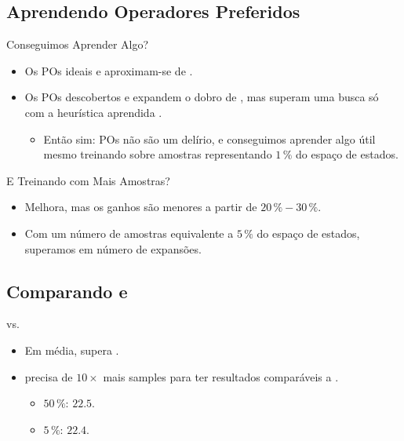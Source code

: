 \documentclass{beamer}
\begin{document}
\subsection{Aprendendo Operadores Preferidos}
\begin{frame}{Conseguimos Aprender Algo?}

\begin{itemize}
\item Os POs ideais \postartable e \postar aproximam-se de \hstar.
\pause
\item Os POs descobertos \pogstar e \pog expandem o dobro de \hstar, mas superam uma busca só com a heurística aprendida \hnn.
\pause
  \begin{itemize}
    \item Então sim: POs não são um delírio, e \alert{conseguimos aprender algo útil} mesmo treinando sobre amostras representando \alert{$1\,\%$ do espaço de estados}.
  \end{itemize}
\end{itemize}
\end{frame}

\begin{frame}{E Treinando com Mais Amostras?}

\begin{itemize}
  \item Melhora, mas os ganhos são menores a partir de $20\,\% - 30\,\%$.
  \pause
  \item Com um número de amostras equivalente a \alert{$5\,\%$} do espaço de estados, \alert{superamos \poff} em número de expansões.
\end{itemize}
\end{frame}

\subsection{Comparando \bfsrs e \bfsrw}
\begin{frame}{\bfsrs vs. \bfsrw}

\begin{itemize}
  \item Em média, \pog \alert{supera} \pofsm.
  \pause
  \item \alert{\pofsm precisa de $10\times$ mais samples} para ter resultados comparáveis a \pog.
    \begin{itemize}
      \item \pofsm $50\,\%$: $22.5$.
      \item \pog $5\,\%$: $22.4$.
    \end{itemize}
\end{itemize}
\end{frame}
\end{document}
